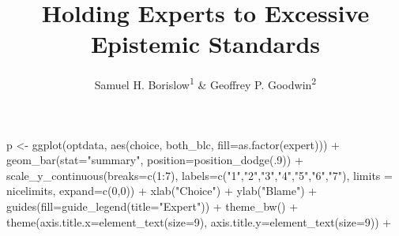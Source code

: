 \documentclass[
  man,floatsintext]{apa6}
\title{Holding Experts to Excessive Epistemic Standards}
\author{Samuel H. Borislow\textsuperscript{1} \& Geoffrey P. Goodwin\textsuperscript{2}}
\date{}
\affiliation{\vspace{0.5cm}\textsuperscript{1} University of Chicago\\\textsuperscript{2} University of Pennsylvania}
\newenvironment{Shaded}{\begin{snugshade}}{\end{snugshade}}
\newcommand{\AttributeTok}[1]{\textcolor[rgb]{0.77,0.63,0.00}{#1}}
\newcommand{\CommentTok}[1]{\textcolor[rgb]{0.56,0.35,0.01}{\textit{#1}}}
\newcommand{\DecValTok}[1]{\textcolor[rgb]{0.00,0.00,0.81}{#1}}
\newcommand{\FunctionTok}[1]{\textcolor[rgb]{0.00,0.00,0.00}{#1}}
\newcommand{\NormalTok}[1]{#1}
\newcommand{\OtherTok}[1]{\textcolor[rgb]{0.56,0.35,0.01}{#1}}
\newcommand{\SpecialCharTok}[1]{\textcolor[rgb]{0.00,0.00,0.00}{#1}}
\newcommand{\StringTok}[1]{\textcolor[rgb]{0.31,0.60,0.02}{#1}}
\begin{document}
\maketitle

\begin{Shaded}
\end{Shaded}



\begin{Shaded}
\begin{Highlighting}[]
\NormalTok{p }\OtherTok{\textless{}{-}} \FunctionTok{ggplot}\NormalTok{(optdata, }\FunctionTok{aes}\NormalTok{(choice, both\_blc, }\AttributeTok{fill=}\FunctionTok{as.factor}\NormalTok{(expert))) }\SpecialCharTok{+}
  \FunctionTok{geom\_bar}\NormalTok{(}\AttributeTok{stat=}\StringTok{"summary"}\NormalTok{, }\AttributeTok{position=}\FunctionTok{position\_dodge}\NormalTok{(.}\DecValTok{9}\NormalTok{)) }\SpecialCharTok{+} 
  \FunctionTok{scale\_y\_continuous}\NormalTok{(}\AttributeTok{breaks=}\FunctionTok{c}\NormalTok{(}\DecValTok{1}\SpecialCharTok{:}\DecValTok{7}\NormalTok{), }\AttributeTok{labels=}\FunctionTok{c}\NormalTok{(}\StringTok{"1"}\NormalTok{,}\StringTok{"2"}\NormalTok{,}\StringTok{"3"}\NormalTok{,}\StringTok{"4"}\NormalTok{,}\StringTok{"5"}\NormalTok{,}\StringTok{"6"}\NormalTok{,}\StringTok{"7"}\NormalTok{), }\AttributeTok{limits =}\NormalTok{ nicelimits, }\AttributeTok{expand=}\FunctionTok{c}\NormalTok{(}\DecValTok{0}\NormalTok{,}\DecValTok{0}\NormalTok{)) }\SpecialCharTok{+}
  \FunctionTok{xlab}\NormalTok{(}\StringTok{"Choice"}\NormalTok{) }\SpecialCharTok{+}
  \FunctionTok{ylab}\NormalTok{(}\StringTok{"Blame"}\NormalTok{) }\SpecialCharTok{+}
  \FunctionTok{guides}\NormalTok{(}\AttributeTok{fill=}\FunctionTok{guide\_legend}\NormalTok{(}\AttributeTok{title=}\StringTok{"Expert"}\NormalTok{)) }\SpecialCharTok{+}
  \FunctionTok{theme\_bw}\NormalTok{() }\SpecialCharTok{+}
  \FunctionTok{theme}\NormalTok{(}\AttributeTok{axis.title.x=}\FunctionTok{element\_text}\NormalTok{(}\AttributeTok{size=}\DecValTok{9}\NormalTok{), }\AttributeTok{axis.title.y=}\FunctionTok{element\_text}\NormalTok{(}\AttributeTok{size=}\DecValTok{9}\NormalTok{)) }\SpecialCharTok{+}

\end{Highlighting}
\end{Shaded}
\end{document}
